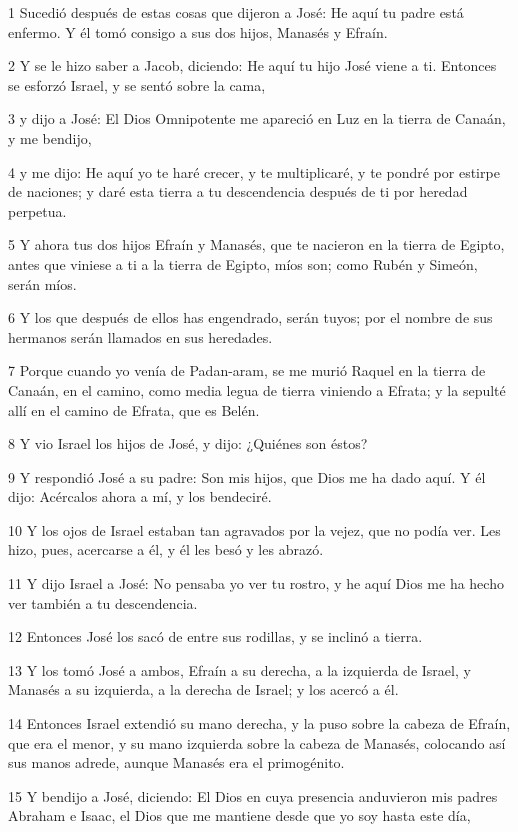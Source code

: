 \par 1  Sucedió después de estas cosas que dijeron a José: He aquí tu padre está enfermo. Y él tomó consigo a sus dos hijos, Manasés y Efraín.
\par 2 Y se le hizo saber a Jacob, diciendo: He aquí tu hijo José viene a ti. Entonces se esforzó Israel, y se sentó sobre la cama,
\par 3 y dijo a José: El Dios Omnipotente me apareció en Luz en la tierra de Canaán, y me bendijo,
\par 4 y me dijo: He aquí yo te haré crecer, y te multiplicaré, y te pondré por estirpe de naciones; y daré esta tierra a tu descendencia después de ti por heredad perpetua.
\par 5 Y ahora tus dos hijos Efraín y Manasés, que te nacieron en la tierra de Egipto, antes que viniese a ti a la tierra de Egipto, míos son; como Rubén y Simeón, serán míos.
\par 6 Y los que después de ellos has engendrado, serán tuyos; por el nombre de sus hermanos serán llamados en sus heredades.
\par 7 Porque cuando yo venía de Padan-aram, se me murió Raquel en la tierra de Canaán, en el camino, como media legua de tierra viniendo a Efrata; y la sepulté allí en el camino de Efrata, que es Belén.
\par 8 Y vio Israel los hijos de José, y dijo: ¿Quiénes son éstos?
\par 9 Y respondió José a su padre: Son mis hijos, que Dios me ha dado aquí. Y él dijo: Acércalos ahora a mí, y los bendeciré.
\par 10 Y los ojos de Israel estaban tan agravados por la vejez, que no podía ver. Les hizo, pues, acercarse a él, y él les besó y les abrazó.
\par 11 Y dijo Israel a José: No pensaba yo ver tu rostro, y he aquí Dios me ha hecho ver también a tu descendencia.
\par 12 Entonces José los sacó de entre sus rodillas, y se inclinó a tierra.
\par 13 Y los tomó José a ambos, Efraín a su derecha, a la izquierda de Israel, y Manasés a su izquierda, a la derecha de Israel; y los acercó a él.
\par 14 Entonces Israel extendió su mano derecha, y la puso sobre la cabeza de Efraín, que era el menor, y su mano izquierda sobre la cabeza de Manasés, colocando así sus manos adrede, aunque Manasés era el primogénito.
\par 15 Y bendijo a José, diciendo: El Dios en cuya presencia anduvieron mis padres Abraham e Isaac, el Dios que me mantiene desde que yo soy hasta este día,

